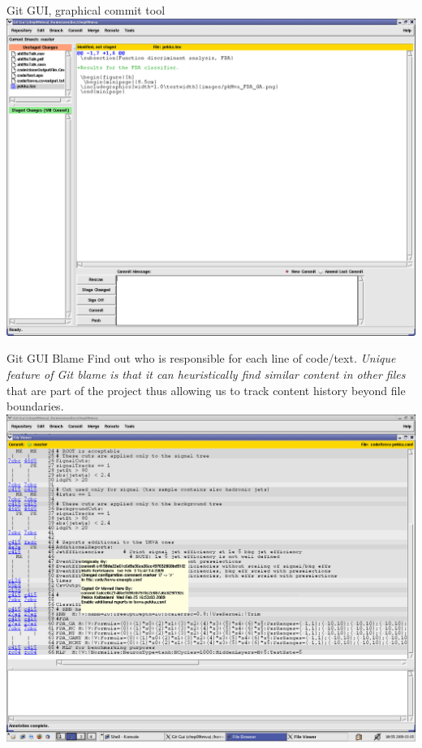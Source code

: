 \documentclass[final,hyperref={pdfpagelabels=false},notitlepage=true]{beamer}
\begin{document}
\begin{frame}{}
\begin{columns}[t]
\begin{column}{0.45\linewidth}
    \begin{block}{\large Git GUI, graphical commit tool}
      \includegraphics[scale=1.0]{images/gui-screenshot.png}
    \end{block}

    \begin{block}{\large Git GUI Blame}
      Find out who is responsible for each line of code/text. \emph{Unique
      feature of Git blame is that it can heuristically find similar
      content in other files} that are part of the project thus
      allowing us to track content history beyond file boundaries.
      \includegraphics[scale=1.0]{images/git-gui-blame-content-copy-detection.png}
    \end{block}


\end{column}
\end{columns}
\end{frame}
\end{document}

